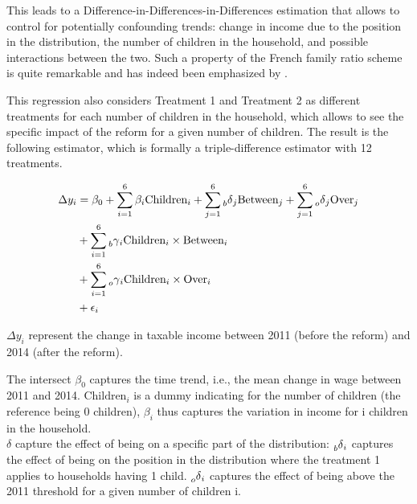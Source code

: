  This leads to a  Difference-in-Differences-in-Differences estimation that allows to control for potentially confounding trends: change in income due to the position in the distribution, the number of children in the household, and possible interactions between the two. Such a property of the French family ratio scheme is quite remarkable and has indeed been emphasized by \citet{piketty1999hauts}.
 
 
 
  This regression also considers Treatment 1 and Treatment 2 as different treatments for each number of children in the household, which allows to see the specific impact of the reform for a given number of children. The result is the following estimator, which is formally a triple-difference estimator with 12 treatments.




  \begin{align}
    \label{eq:triple-diff}
  \begin{split} 
  \Delta y_i &= \beta_0 + \sum_{i=1}^{6} {\beta_i \text{Children}_i} + \sum_{j=1}^{6} {\prescript{}{b}\delta_j \text{Between}_j}  + \sum_{j=1}^{6} {\prescript{}{o}\delta_j \text{Over}_j} \\
      &+ \sum_{i=1}^6 {\prescript{}{b}\gamma_{i} \text{Children}_i \times \text{Between}_i} \\
      &+ \sum_{i=1}^6 {\prescript{}{o}\gamma_{i} \text{Children}_i \times \text{Over}_i} \\
      & + \epsilon_i
  \end{split}
  \end{align}




$\Delta y_i$ represent the change in taxable income between 2011 (before the reform) and 2014 (after the reform).

  The intersect $\beta_0$ captures the time trend, i.e., the mean change in wage between 2011 and 2014. $\text{Children}_i$ is a dummy indicating for the number of children (the reference being 0 children), $\beta_i$ thus captures the variation in income for i children in the household. \\ $\delta $  capture the effect of being on a specific part of the distribution: $\prescript{}{b}\delta_i $ captures the effect of being on the position in the distribution where the treatment 1 applies to households having 1 child. $\prescript{}{o}\delta_i $ captures the effect of being above the 2011 threshold for a given number of children i.


